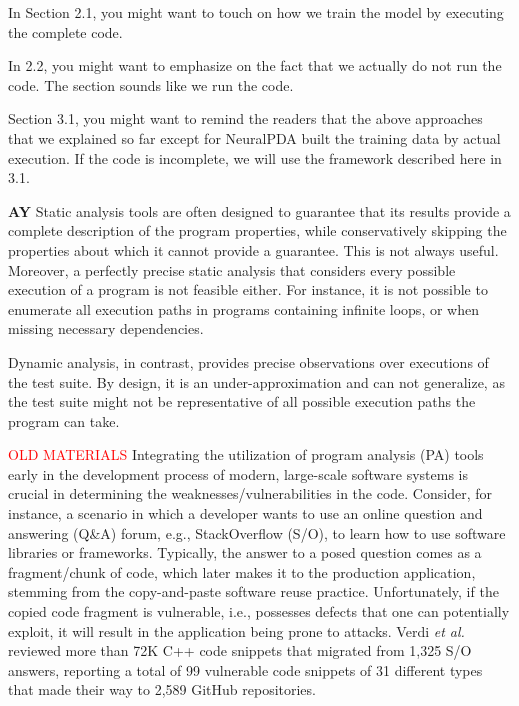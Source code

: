 In Section 2.1, you might want to touch on how we train the model by executing the complete code.

In 2.2, you might want to emphasize on the fact that we actually do not run the code. The section sounds like we run the code.

Section 3.1, you might want to remind the readers that the above approaches that we explained so far except for NeuralPDA built the training data by actual execution. If the code is incomplete, we will use the framework described here in 3.1.


{\bf AY} Static analysis tools are often designed to guarantee that its results
provide a complete description of the program properties, while
conservatively skipping the properties about which it cannot provide a
guarantee. This is not always useful. Moreover, a perfectly precise
static analysis that considers every possible execution of a program
is not feasible either. For instance, it is not possible to enumerate
all execution paths in programs containing infinite loops, or when
missing necessary dependencies.

Dynamic analysis, in contrast, provides precise observations over
executions of the test suite. By design, it is an under-approximation
and can not generalize, as the test suite might not be representative
of all possible execution paths the program can take.



{\textcolor{red}{OLD MATERIALS}}
Integrating the utilization of program analysis (PA) tools early in the development process of modern, large-scale software systems is crucial in determining the weaknesses/vulnerabilities in the code. Consider, for instance, a scenario in which a developer wants to use an online question and answering (Q\&A) forum, e.g., StackOverflow (S/O), to learn how to use software libraries or frameworks. Typically, the answer to a posed question comes as a fragment/chunk of code, which later makes it to the production application, stemming from the copy-and-paste software reuse practice. Unfortunately, if the copied code fragment is vulnerable, i.e., possesses defects that one can potentially exploit, it will result in the application being prone to attacks. Verdi {\em et al.}~\cite{verdi-tse22} reviewed more than 72K C++ code snippets that migrated from 1,325 S/O answers, reporting a total of 99 vulnerable code snippets of 31 different types that made their way to 2,589 GitHub repositories.

